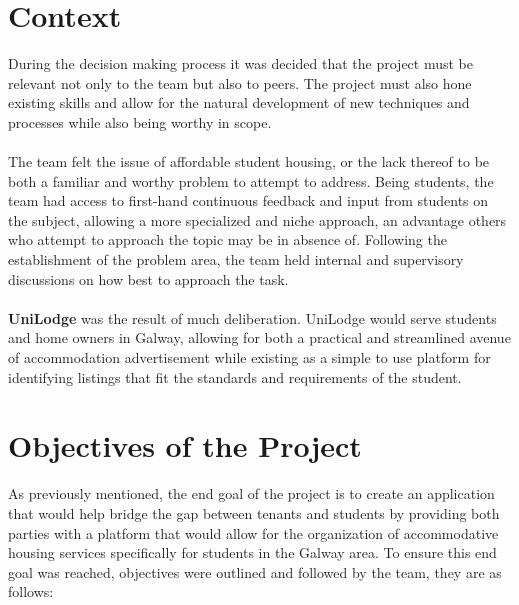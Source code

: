 \section{Context}
During the decision making process it was decided that the project must be relevant not only to the team but also to peers. The project must also hone existing skills and allow for the natural development of new techniques and processes while also being worthy in scope. 

\paragraph{}
The team felt the issue of affordable student housing, or the lack thereof to be both a familiar and worthy problem to attempt to address. Being students, the team had access to first-hand continuous feedback and input from students on the subject, allowing a more specialized and niche approach, an advantage others who attempt to approach the topic may be in absence of. Following the establishment of the problem area, the team held internal and supervisory discussions on how best to approach the task.

\paragraph{}
\textbf{UniLodge} was the result of much deliberation. UniLodge would serve students and home owners in Galway, allowing for both a practical and streamlined avenue of accommodation advertisement while existing as a simple to use platform for identifying listings that fit the standards and requirements of the student. 
\section{Objectives of the Project}
As previously mentioned, the end goal of the project is to create an application that would help bridge the gap between tenants and students by providing both parties with a platform that would allow for the organization of accommodative housing services specifically for students in the Galway area. To ensure this end goal was reached, objectives were outlined and followed by the team, they are as follows:

